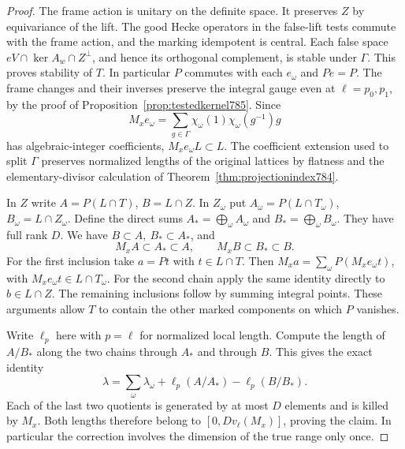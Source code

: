 \documentclass[a4paper,11pt]{article}
\theoremstyle{definition}
\theoremstyle{remark}
\numberwithin{equation}{section}
\begin{document}
\begin{proof}
The frame action is unitary on the definite space. It
preserves \(Z\) by equivariance of the lift. The good
Hecke operators in the false-lift tests commute with the
frame action, and the marking idempotent is central.
Each false space \(eV\cap\ker A_w\cap Z^\perp\), and hence
its orthogonal complement, is stable under \(\Gamma\).
This proves stability of \(T\). In particular \(P\)
commutes with each \(e_\omega\) and \(Pe=P\).
The frame changes and their inverses preserve the integral
gauge even at \(\ell=p_0,p_1\), by the proof of
Proposition~\ref{prop:testedkernel785}. Since
\[
 M_x e_\omega=\sum_{g\in\Gamma}
                   \chi_\omega(1)\chi_\omega(g^{-1})g
\]
has algebraic-integer coefficients, \(M_x e_\omega L\subset L\).
The coefficient extension used to split \(\Gamma\) preserves
normalized lengths of the original lattices by flatness and
the elementary-divisor calculation of
Theorem~\ref{thm:projectionindex784}.

In \(Z\) write \(A=P(L\cap T)\), \(B=L\cap Z\). In
\(Z_\omega\) put \(A_\omega=P(L\cap T_\omega)\),
\(B_\omega=L\cap Z_\omega\). Define the direct sums
\(A_*=\bigoplus_\omega A_\omega\) and
\(B_*=\bigoplus_\omega B_\omega\). They have full rank
\(D\). We have \(B\subset A,\ B_*\subset A_*\), and
\[
                M_x A\subset A_*\subset A,\qquad
                M_x B\subset B_*\subset B.
\]
For the first inclusion take \(a=Pt\) with \(t\in L\cap T\).
Then \(M_x a=\sum_\omega P(M_x e_\omega t)\), with
\(M_xe_\omega t\in L\cap T_\omega\). For the second
chain apply the same identity directly to \(b\in L\cap Z\).
The remaining inclusions follow by summing integral points.
These arguments allow \(T\) to contain the other marked
components on which \(P\) vanishes.

Write \(\ell_p\) here with \(p=\ell\) for normalized local
length. Compute the length of \(A/B_*\) along the two
chains through \(A_*\) and through \(B\). This gives the
exact identity
\[
      \lambda=\sum_{\omega}\lambda_\omega+
                   \ell_p(A/A_*)-\ell_p(B/B_*) .
\]
Each of the last two quotients is generated by at most
\(D\) elements and is killed by \(M_x\). Both lengths
therefore belong to \([0,Dv_\ell(M_x)]\), proving the
claim. In particular the correction involves the dimension
of the true range only once.
\end{proof}
\end{document}

